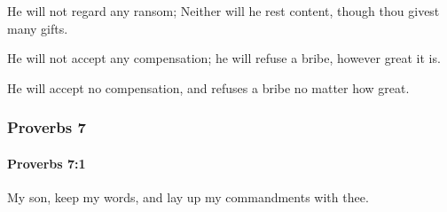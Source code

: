			\begin{versebox}
					\item[BHS] 
					\item[ASV] He will not regard any ransom; Neither will he rest content, though thou givest many gifts.
					\item[NIV] He will not accept any compensation; he will refuse a bribe, however great it is.
					\item[NRSV] He will accept no compensation, and refuses a bribe no matter how great.
			\end{versebox}
	\subsubsection{Proverbs 7} %
		\label{PROVERBS-7}

		\paragraph{Proverbs 7:1} %
			\label{PROVERBS-7-1}

			My son, keep my words, and lay up my commandments with thee.


